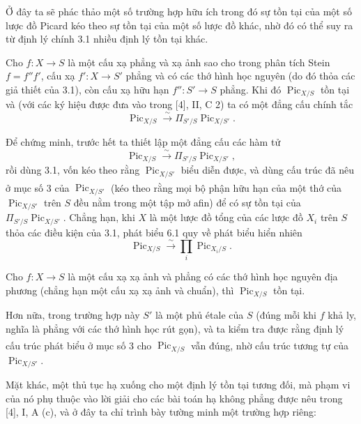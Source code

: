 Ở đây ta sẽ phác thảo một số trường hợp hữu ích trong đó sự tồn tại của một số
lược đồ Picard kéo theo sự tồn tại của một số lược đồ khác, nhờ đó có thể suy
ra từ định lý chính 3.1 nhiều định lý tồn tại khác.

 Cho $f:X\longrightarrow S$ là một cấu xạ phẳng và xạ ảnh
sao cho trong phân tích Stein $f=f''f'$, cấu xạ
$f':X\longrightarrow S'$ phẳng và có các thớ hình học nguyên (do đó thỏa các
giả thiết của 3.1), còn cấu xạ hữu hạn $f'':S'\longrightarrow S$ phẳng. Khi đó
$\operatorname{Pic}_{X/S}$ tồn tại và (với các ký hiệu được đưa vào trong [4],
II, C 2) ta có một đẳng cấu chính tắc
\[
\operatorname{Pic}_{X/S}\xrightarrow{\sim}
\Pi_{S'/S}\operatorname{Pic}_{X/S'}.
\]

Để chứng minh, trước hết ta thiết lập một đẳng cấu các hàm tử
\[
\operatorname{Pic}_{X/S}\xrightarrow{\sim}
\Pi_{S'/S}\operatorname{Pic}_{X/S'},
\]
rồi dùng 3.1, vốn kéo theo rằng $\operatorname{Pic}_{X/S'}$ biểu diễn được, và
dùng cấu trúc đã nêu ở mục số\textsuperscript{} 3 của
$\operatorname{Pic}_{X/S'}$ (kéo theo rằng mọi bộ phận hữu hạn của một thớ của
$\operatorname{Pic}_{X/S'}$ trên $S$ đều nằm trong một tập mở afin) để có sự
tồn tại của $\Pi_{S'/S}\operatorname{Pic}_{X/S'}$.
Chẳng hạn, khi $X$ là một lược đồ tổng của các lược đồ $X_i$ trên $S$ thỏa các
điều kiện của 3.1, phát biểu 6.1 quy về phát biểu hiển nhiên
\[
\operatorname{Pic}_{X/S}\xrightarrow{\sim}
\prod_i\operatorname{Pic}_{X_i/S}.
\]

 Cho $f:X\longrightarrow S$ là một cấu xạ xạ ảnh và phẳng
có các thớ hình học nguyên địa phương (chẳng hạn một cấu xạ xạ ảnh và chuẩn),
thì $\operatorname{Pic}_{X/S}$ tồn tại.

Hơn nữa, trong trường hợp này $S'$ là một phủ étale của $S$ (đúng mỗi khi $f$
khả ly, nghĩa là phẳng với các thớ hình học rút gọn), và ta kiểm tra được rằng
định lý cấu trúc phát biểu ở mục số\textsuperscript{} 3 cho
$\operatorname{Pic}_{X/S}$ vẫn đúng, nhờ cấu trúc tương tự của
$\operatorname{Pic}_{X/S'}$.

Mặt khác, một thủ tục hạ xuống cho một định lý tồn tại tương đối, mà phạm vi
của nó phụ thuộc vào lời giải cho các bài toán hạ không phẳng được nêu trong
[4], I, A (c), và ở đây ta chỉ trình bày tường minh một trường hợp riêng:

